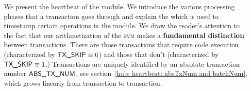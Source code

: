 We present the heartbeat of the \hubMod{} module.
We introduce the various processing phases that a transaction goes through and explain the \hubStamp{} which is used to timestamp certain operations in the \hubMod{} module.
We draw the reader's attention to the fact that our arithmetization of the \textsc{evm} makes a \textbf{fundamental distinction} between transactions.
There are those transactions that require code execution (characterized by $\textsf{TX}\textsf{\_SKIP} \equiv 0$) and those that don't (characterized by $\textsf{TX}\textsf{\_SKIP} \equiv 1$.)
Transactions are uniquely identified by an absolute transaction number $\textsf{ABS\_TX\_NUM}$, see section~\ref{hub: heartbeat: absTxNum and batchNum}, which grows linearly from transaction to transaction.
